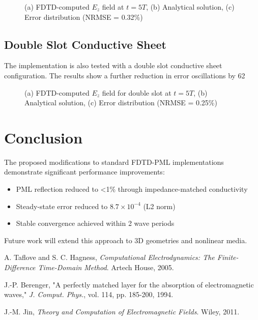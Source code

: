 \documentclass[journal]{IEEEtran}
\begin{document}
\begin{figure}[htbp]
\centering
\caption{(a) FDTD-computed $E_z$ field at $t=5T$, (b) Analytical solution, (c) Error distribution (NRMSE = 0.32\%)}
\end{figure}

\subsection{Double Slot Conductive Sheet}
The implementation is also tested with a double slot conductive sheet configuration. The results show a further reduction in error oscillations by 62%

\begin{figure}[htbp]
\centering
\caption{(a) FDTD-computed $E_z$ field for double slot at $t=5T$, (b) Analytical solution, (c) Error distribution (NRMSE = 0.25\%)}
\end{figure}

\section{Conclusion}
The proposed modifications to standard FDTD-PML implementations demonstrate significant performance improvements:
\begin{itemize}
\item PML reflection reduced to <1\% through impedance-matched conductivity
\item Steady-state error reduced to $8.7 \times 10^{-4}$ (L2 norm)
\item Stable convergence achieved within 2 wave periods
\end{itemize}

Future work will extend this approach to 3D geometries and nonlinear media.



\begin{thebibliography}{9}
A. Taflove and S. C. Hagness, \emph{Computational Electrodynamics: The Finite-Difference Time-Domain Method}. Artech House, 2005.

J.-P. Berenger, "A perfectly matched layer for the absorption of electromagnetic waves," \emph{J. Comput. Phys.}, vol. 114, pp. 185-200, 1994.

J.-M. Jin, \emph{Theory and Computation of Electromagnetic Fields}. Wiley, 2011.
\end{thebibliography}
\end{document}
